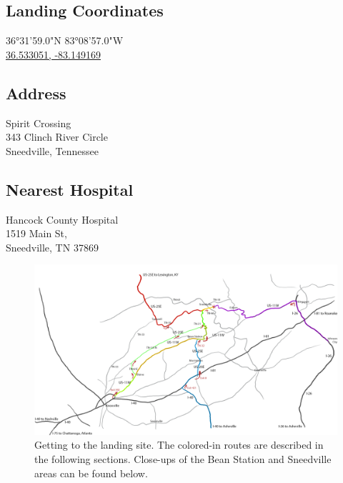 \begin{multicols}{3}

\subsection*{Landing Coordinates}
36\si{\degree}31'59.0"N 83\si{\degree}08'57.0"W\\
\href{https://goo.gl/maps/pc3gYuNiF2r}{36.533051, -83.149169}

\subsection*{Address}
Spirit Crossing\\
343 Clinch River Circle\\
Sneedville, Tennessee

\subsection*{Nearest Hospital}
Hancock County Hospital\\
1519 Main St,\\
Sneedville, TN 37869

\end{multicols}

\begin{figure}
\centering
\includegraphics[width=\textwidth]{images/maptosite_highlighted.png}
\caption{Getting to the landing site. The colored-in routes are described in the following sections. Close-ups of the Bean Station and Sneedville areas can be found below.}
\label{image:overviewmap}
\end{figure}

